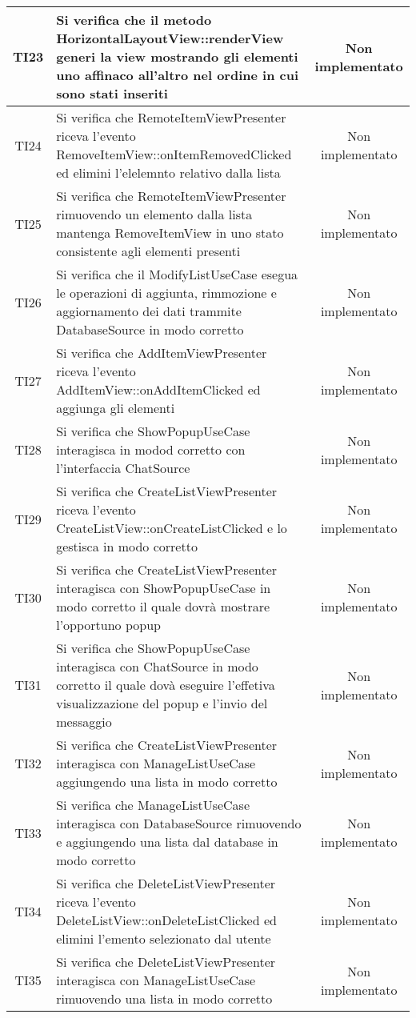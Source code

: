 \begin{center}
\begin{longtable}{|c|>{\centering}m{10cm}|c|}
		TI23 & Si verifica che il metodo HorizontalLayoutView::renderView generi la view mostrando gli elementi uno affinaco all'altro nel ordine in cui sono stati inseriti & Non implementato \\ \hline
		TI24 & Si verifica che RemoteItemViewPresenter riceva l'evento RemoveItemView::onItemRemovedClicked ed elimini l'elelemnto relativo dalla lista & Non implementato \\ \hline
		TI25 & Si verifica che RemoteItemViewPresenter rimuovendo un elemento dalla lista mantenga RemoveItemView in uno stato consistente agli elementi presenti & Non implementato \\ \hline
		TI26 & Si verifica che il ModifyListUseCase esegua le operazioni di aggiunta, rimmozione e aggiornamento dei dati trammite DatabaseSource in modo corretto & Non implementato \\ \hline
		TI27 & Si verifica che AddItemViewPresenter riceva l'evento AddItemView::onAddItemClicked ed aggiunga gli elementi & Non implementato \\ \hline
		TI28 & Si verifica che ShowPopupUseCase interagisca in modod corretto con l'interfaccia ChatSource & Non implementato \\ \hline
		TI29 & Si verifica che CreateListViewPresenter riceva l'evento CreateListView::onCreateListClicked e lo gestisca in modo corretto & Non implementato \\ \hline
		TI30 & Si verifica che CreateListViewPresenter interagisca con ShowPopupUseCase in modo corretto il quale dovrà mostrare l'opportuno popup & Non implementato \\ \hline
		TI31 & Si verifica che ShowPopupUseCase interagisca con ChatSource in modo corretto il quale dovà eseguire l'effetiva visualizzazione del popup e l'invio del messaggio & Non implementato \\ \hline
		TI32 & Si verifica che CreateListViewPresenter interagisca con ManageListUseCase aggiungendo una lista in modo corretto & Non implementato \\ \hline
		TI33 & Si verifica che ManageListUseCase interagisca con DatabaseSource rimuovendo e aggiungendo una lista dal database in modo corretto & Non implementato \\ \hline
		TI34 & Si verifica che DeleteListViewPresenter riceva l'evento DeleteListView::onDeleteListClicked ed elimini l'emento selezionato dal utente & Non implementato \\ \hline
		TI35 & Si verifica che DeleteListViewPresenter interagisca con ManageListUseCase rimuovendo una lista in modo corretto & Non implementato \\ \hline

\end{longtable}
\end{center}
